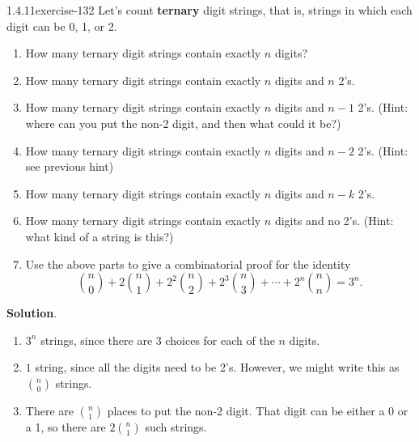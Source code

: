 \documentclass[twoside,11pt,]{book}
\newcommand{\terminology}[1]{\textbf{#1}}
\numberwithin{equation}{chapter}
\begin{document}
\begin{divisionsolution}{1.4.11}{}{exercise-132}%
\hypertarget{p-2146}{}%
Let's count \terminology{ternary} digit strings, that is, strings in which each digit can be 0, 1, or 2.\leavevmode%
\begin{enumerate}[label=(\alph*)]
\item\hypertarget{li-1339}{}\hypertarget{p-2147}{}%
How many ternary digit strings contain exactly \(n\) digits?%
\item\hypertarget{li-1340}{}\hypertarget{p-2148}{}%
How many ternary digit strings contain exactly \(n\) digits and \(n\) 2's.%
\item\hypertarget{li-1341}{}\hypertarget{p-2149}{}%
How many ternary digit strings contain exactly \(n\) digits and \(n-1\) 2's. (Hint: where can you put the non-2 digit, and then what could it be?)%
\item\hypertarget{li-1342}{}\hypertarget{p-2150}{}%
How many ternary digit strings contain exactly \(n\) digits and \(n-2\) 2's. (Hint: see previous hint)%
\item\hypertarget{li-1343}{}\hypertarget{p-2151}{}%
How many ternary digit strings contain exactly \(n\) digits and \(n-k\) 2's.%
\item\hypertarget{li-1344}{}\hypertarget{p-2152}{}%
How many ternary digit strings contain exactly \(n\) digits and no 2's. (Hint: what kind of a string is this?)%
\item\hypertarget{li-1345}{}\hypertarget{p-2153}{}%
Use the above parts to give a combinatorial proof for the identity%
\begin{equation*}
{n \choose 0} + 2{n \choose 1} + 2^2{n \choose 2} + 2^3{n \choose 3} + \cdots + 2^n{n \choose n} = 3^n\text{.}
\end{equation*}
%
\end{enumerate}
%
\par\smallskip%
\noindent\textbf{Solution}.\quad%
\hypertarget{p-2154}{}%
\leavevmode%
\begin{enumerate}[label=(\alph*)]
\item\hypertarget{li-1346}{}\(3^n\) strings, since there are 3 choices for each of the \(n\) digits.%
\item\hypertarget{li-1347}{}\(1\) string, since all the digits need to be 2's. However, we might write this as \({n \choose 0}\) strings.%
\item\hypertarget{li-1348}{}\hypertarget{p-2155}{}%
There are \({n \choose 1}\) places to put the non-2 digit. That digit can be either a 0 or a 1, so there are \(2{n \choose 1}\) such strings.%

\end{enumerate}
\end{divisionsolution}
\end{document}
